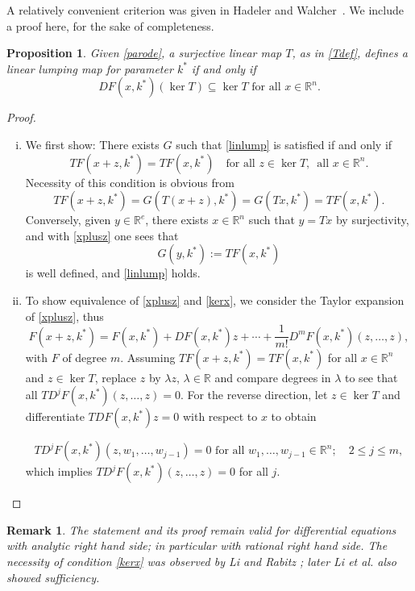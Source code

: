 \documentclass{article}
\newtheorem{remark}{Remark}
\newtheorem{proposition}{Proposition}
\begin{document}
A relatively convenient criterion was given in Hadeler and Walcher~\cite{HW2006}. We include a proof here, for the sake of completeness.
\begin{proposition}\label{HWprop}
Given \eqref{parode}, a surjective linear map $T$, as in \eqref{Tdef},  defines a linear lumping map for parameter $k^*$ if and only if 
\begin{equation}\label{kerx}
DF(x,k^*)\left(\ker T\right)\subseteq \ker T \text{  for all  }x\in\mathbb R^n.
\end{equation}
\end{proposition}
\begin{proof}
\begin{enumerate}[(i)]
\item We first show: There exists $G$ such that \eqref{linlump} is satisfied if and only if
\begin{equation}\label{xplusz}
TF(x+z,k^*)=TF(x,k^*)\quad \text{for all  } z\in\ker T,\,\text{  all  }x\in \mathbb R^n.
\end{equation}
Necessity of this condition is obvious from
\[
TF(x+z, k^*)=G(T(x+z),k^*)=G(Tx,k^*)=TF(x,k^*).
\]
Conversely, given $y\in \mathbb R^e$, there exists $x\in\mathbb R^n$ such that $y=Tx$ by surjectivity,  and with \eqref{xplusz} one sees that
\[
G(y,k^*):=TF(x,k^*)
\]
is well defined, and \eqref{linlump} holds.
\item 
To show equivalence of \eqref{xplusz} and \eqref{kerx}, we consider the Taylor expansion of \eqref{xplusz}, thus
\[
F(x+z,k^*)=F(x,k^*)+DF(x,k^*)z+\cdots+ \frac1{m!}D^mF(x,k^*)(z,\ldots,z),
\]
with $F$ of degree $m$.
Assuming $TF(x+z,k^*)=TF(x,k^*)$ for all $x\in \mathbb R^n$ and $z\in \ker T$, replace $z$ by $\lambda z$, $\lambda\in\mathbb R$ and compare degrees in $\lambda$ to see that all $TD^jF(x,k^*)(z,\ldots,z)=0$. For the reverse direction, let $z\in\ker T$ and differentiate $TDF(x,k^*)z=0$ with respect to $x$ to obtain

\[
TD^jF(x,k^*)(z,w_1,\ldots,w_{j-1})=0 \text{  for all  } w_1,\ldots, w_{j-1}\in\mathbb R^n; \quad 2\leq j\leq m,
\]
which implies $TD^jF(x,k^*)(z,\ldots,z)=0$ for all $j$.
\end{enumerate}
\end{proof}
\begin{remark} {\em  The statement and its proof remain valid for differential equations with analytic right hand side; in particular with rational right hand side.
The necessity of condition \eqref{kerx} was observed by Li and Rabitz \cite{LR1989}; later Li et al. \cite{LRT1994} also showed sufficiency.}
\end{remark}
\end{document}
